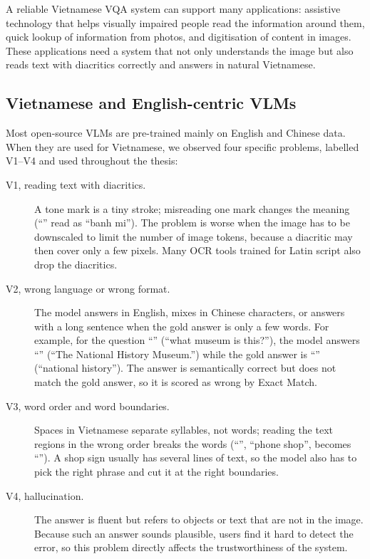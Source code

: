 A reliable Vietnamese VQA system can support many applications: assistive
technology that helps visually impaired people read the information around them,
quick lookup of information from photos, and digitisation of content in images.
These applications need a system that not only understands the image but also
reads text with diacritics correctly and answers in natural Vietnamese.

\subsection{Vietnamese and English-centric VLMs}

Most open-source VLMs are pre-trained mainly on English and Chinese data. When they
are used for Vietnamese, we observed four specific problems, labelled V1--V4
and used throughout the thesis:

\begin{description}
  \item[V1, reading text with diacritics.] A tone mark is a tiny stroke;
  misreading one mark changes the meaning (``'' read as ``banh mi'').
  The problem is worse when the image has to be downscaled to limit the number of
  image tokens, because a diacritic may then cover only a few pixels. Many OCR tools
  trained for Latin script also drop the diacritics.
  \item[V2, wrong language or wrong format.] The model answers in English, mixes in
  Chinese characters, or answers with a long sentence when the gold answer is only a
  few words. For example, for the question ``'' (``what
  museum is this?''), the model answers ``'' (``The
  National History Museum.'') while the gold answer is ``''
  (``national history''). The answer is semantically correct but does not match the
  gold answer, so it is scored as wrong by Exact Match.
  \item[V3, word order and word boundaries.] Spaces in Vietnamese separate
  syllables, not words; reading the text regions in the wrong order breaks the words
  (``'', ``phone shop'', becomes ``''). A shop sign usually has several lines of text, so the model also has to
  pick the right phrase and cut it at the right boundaries.
  \item[V4, hallucination.] The answer is fluent but refers to objects or text that
  are not in the image. Because such an answer sounds plausible, users find it hard
  to detect the error, so this problem directly affects the trustworthiness of the
  system.
\end{description}

